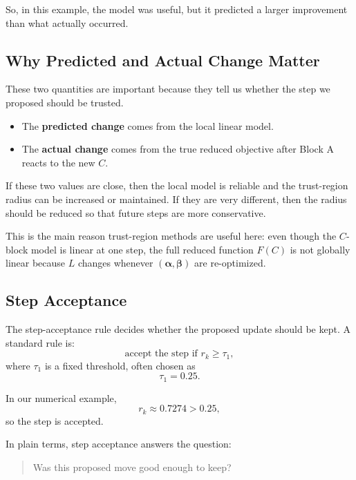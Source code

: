 \documentclass{article}
\begin{document}
So, in this example, the model was useful, but it predicted a larger improvement than what actually occurred.

\subsection{Why Predicted and Actual Change Matter}

These two quantities are important because they tell us whether the step we proposed should be trusted.

\begin{itemize}
    \item The \textbf{predicted change} comes from the local linear model.
    \item The \textbf{actual change} comes from the true reduced objective after Block A reacts to the new $C$.
\end{itemize}

If these two values are close, then the local model is reliable and the trust-region radius can be increased or maintained. If they are very different, then the radius should be reduced so that future steps are more conservative.

This is the main reason trust-region methods are useful here: even though the $C$-block model is linear at one step, the full reduced function $F(C)$ is not globally linear because $L$ changes whenever $(\boldsymbol{\alpha},\boldsymbol{\beta})$ are re-optimized.

\subsection{Step Acceptance}

The step-acceptance rule decides whether the proposed update should be kept. A standard rule is:
\begin{equation}
 \text{accept the step if } r_k \geq \tau_1,
\end{equation}
where $\tau_1$ is a fixed threshold, often chosen as
\begin{equation}
 \tau_1 = 0.25.
\end{equation}

In our numerical example,
\begin{equation}
 r_k \approx 0.7274 > 0.25,
\end{equation}
so the step is accepted.

In plain terms, step acceptance answers the question:

\begin{quote}
Was this proposed move good enough to keep?
\end{quote}
\end{document}
